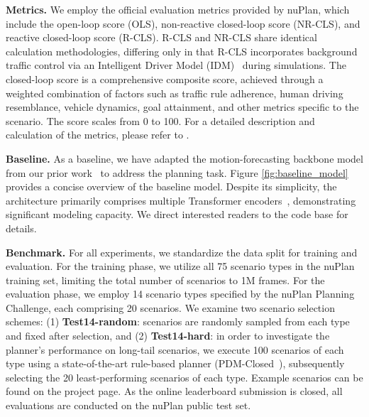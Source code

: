 \documentclass[letterpaper, 10 pt, conference]{ieeeconf}  %
\renewcommand{\paragraph}[1]{\vspace{1.25mm}\noindent\textbf{#1}}
\begin{document}
\paragraph{Metrics.} 
We employ the official evaluation metrics provided by nuPlan, which include the open-loop score (OLS), non-reactive closed-loop score (NR-CLS), and reactive closed-loop score (R-CLS). 
R-CLS and NR-CLS share identical calculation methodologies, differing only in that R-CLS incorporates background traffic control via an Intelligent Driver Model (IDM)~\cite{treiber2000idm} during simulations. 
The closed-loop score is a comprehensive composite score, achieved through a weighted combination of factors such as traffic rule adherence, human driving resemblance, vehicle dynamics, goal attainment, and other metrics specific to the scenario. The score scales from 0 to 100.  
For a detailed description and calculation of the metrics, please refer to \cite{nuplan2023metrics}.

\paragraph{Baseline.}
As a baseline, we have adapted the motion-forecasting backbone model from our prior work~\cite{cheng2023forecast} to address the planning task. Figure \ref{fig:baseline_model} provides a concise overview of the baseline model.
Despite its simplicity, the architecture primarily comprises multiple Transformer encoders~\cite{vaswani2017attention}, demonstrating significant modeling capacity. We direct interested readers to the code base for details.

\paragraph{Benchmark.} 
For all experiments, we standardize the data split for training and evaluation. For the training phase, we utilize all 75 scenario types in the nuPlan training set, limiting the total number of scenarios to 1M frames. For the evaluation phase, we employ 14 scenario types specified by the nuPlan Planning Challenge, each comprising 20 scenarios. We examine two scenario selection schemes: (1) \textbf{Test14-random}: scenarios are randomly sampled from each type and fixed after selection, and (2) \textbf{Test14-hard}: in order to investigate the planner's performance on long-tail scenarios, we execute 100 scenarios of each type using a state-of-the-art rule-based planner (PDM-Closed~\cite{Dauner2023CORL}), subsequently selecting the 20 least-performing scenarios of each type. Example scenarios can be found on the project page.  As the online leaderboard submission is closed, all evaluations are conducted on the nuPlan public test set.
\end{document}
